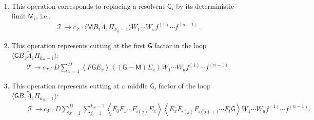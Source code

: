 \documentclass[10pt,reqno]{amsart}
\numberwithin{equation}{section}
\numberwithin{figure}{section}
\theoremstyle{plain} %
\theoremstyle{definition} %
\newcommand{\wt}{\widetilde}
\newcommand{\cT}{\mathcal T}
\newcommand{\sG}{\mathsf G}
\newcommand{\sM}{\mathsf M}
\newcommand{\avg}[1]{\langle #1 \rangle}
\newcommand{\tLambda}{{\wt{\Lambda}}}
\newcommand{\sreplace}{\mathsf{Replace}}
\newcommand{\scut}[1]{\mathsf{Cut}_{#1}}
\numberwithin{equation}{section}
\begin{document}
    \begin{enumerate}
        \item[$\sreplace$:] This operation corresponds to replacing a resolvent $\sG_i$ by its deterministic limit $\sM_i$, i.e., 
    \begin{equation}\label{sreplace_def}
        \begin{aligned}
            \cT \to c_{\cT}\cdot \avg{ \sM B_1 \tLambda_1 \Pi_{k_{\#}-1} } W_1 \cdots W_u f^{(1)} \cdots f^{(n-1)}.
        \end{aligned}
    \end{equation}
        \item[$\scut{1}$:] This operation represents cutting at the first $\sG$ factor in the loop $\avg{ \sG B_1 \tLambda_1 \Pi_{k_{\#}-1}}$:
        \begin{equation}\label{scut1_def}
            \begin{aligned}
                \cT \to c_{\cT} \cdot D \sum_{x=1}^D\left\langle F \sG E_x\right\rangle\left\langle\left(\sG-\sM\right) E_x\right\rangle W_1 \cdots W_u f^{(1)} \cdots f^{(n-1)}.
            \end{aligned}
        \end{equation}
        \item[$\scut{2}$:] This operation represents cutting at a middle $\sG_i$ factor of the loop $\avg{ \sG B_1 \tLambda_1 \Pi_{k_{\#}-1}}$: %
        \begin{equation}\label{scut_2}
            \begin{aligned}
             \qquad    \cT \to c_{\cT} \cdot D \sum_{x=1}^D \sum_{j=1}^{k_{\#}-1}\left\langle F_0 F_1 \cdots F_{i(j)} E_x\right\rangle\left\langle E_x F_{i(j)} F_{i(j)+1} \cdots F_t \sG\right\rangle W_1 \cdots W_u f^{(1)} \cdots f^{(n-1)}.
            \end{aligned}
        \end{equation}
        

\end{enumerate}
\end{document}
